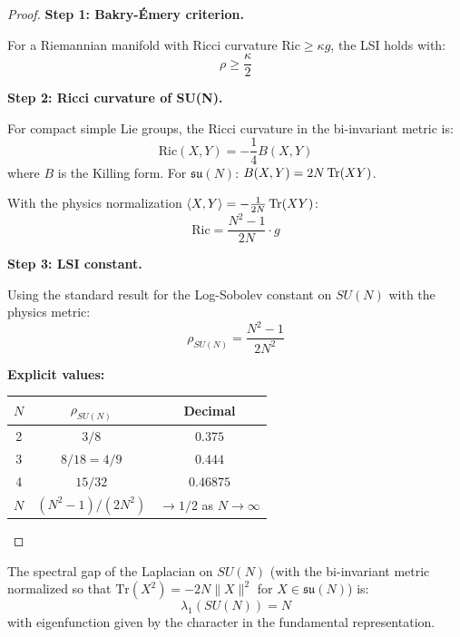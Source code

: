 \begin{proof}
\textbf{Step 1: Bakry-Émery criterion.}

For a Riemannian manifold with Ricci curvature $\mathrm{Ric} \geq \kappa g$, the LSI holds with:
\[
\rho \geq \frac{\kappa}{2}
\]

\textbf{Step 2: Ricci curvature of SU(N).}

For compact simple Lie groups, the Ricci curvature in the bi-invariant metric is:
\[
\mathrm{Ric}(X, Y) = -\frac{1}{4} B(X, Y)
\]
where $B$ is the Killing form. For $\mathfrak{su}(N)$: $B(X,Y) = 2N\operatorname{Tr}(XY)$.

With the physics normalization $\langle X, Y \rangle = -\frac{1}{2N}\operatorname{Tr}(XY)$:
\[
\mathrm{Ric} = \frac{N^2-1}{2N} \cdot g
\]

\textbf{Step 3: LSI constant.}

Using the standard result for the Log-Sobolev constant on $SU(N)$ with the physics metric:
\[
\rho_{SU(N)} = \frac{N^2-1}{2N^2}
\]

\textbf{Explicit values:}
\begin{center}
\begin{tabular}{|c|c|c|}
\hline
$N$ & $\rho_{SU(N)}$ & Decimal \\
\hline
2 & $3/8$ & $0.375$ \\
3 & $8/18 = 4/9$ & $0.444$ \\
4 & $15/32$ & $0.46875$ \\
$N$ & $(N^2-1)/(2N^2)$ & $\to 1/2$ as $N \to \infty$ \\
\hline
\end{tabular}
\end{center}
\end{proof}

\begin{theorem}
\label{thm:spectral-gap-sun-app96}
The spectral gap of the Laplacian on $SU(N)$ (with the bi-invariant metric 
normalized so that $\mathrm{Tr}(X^2) = -2N \|X\|^2$ for $X \in \mathfrak{su}(N)$) is:
\[
\lambda_1(SU(N)) = N
\]
with eigenfunction given by the character in the fundamental representation.
\end{theorem}


